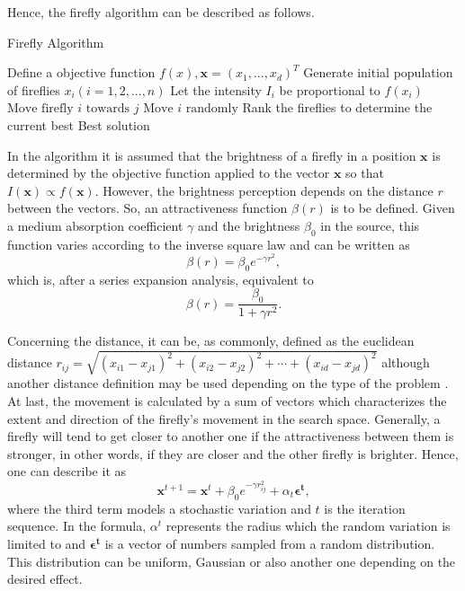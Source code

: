 \documentclass[tuberlin,cic,tc,openright,english,noabntcite,oneside]{iiufrgs}
\begin{document}
Hence, the firefly algorithm can be described as follows.
\begin{algorithm}[H]
\caption{Firefly Algorithm}
\begin{algorithmic}
\State Define a objective function $f(x), \mathbf{x}=(x_{1},...,x_{d})^{T}$
\State Generate initial population of fireflies $x_{i}(i=1,2,...,n)$
\State Let the intensity $I_{i}$ be proportional to $f(x_{i})$
				\State $\text{Move firefly }i\text{ towards }j$
			\EndIf
		\EndFor
	\EndFor
		\State $\text{Move }i\text{ randomly}$
	\EndIf
	\State Rank the fireflies to determine the current best
\EndWhile
\State \Return Best solution
\EndFunction
\end{algorithmic}
\end{algorithm}

In the algorithm it is assumed that the brightness of a firefly in a position $\mathbf{x}$ is determined by the objective function applied to the vector $\mathbf{x}$ so that $I(\mathbf{x}) \propto f(\mathbf{x})$. However, the brightness perception depends on the distance $r$ between the vectors. So, an attractiveness function $\beta(r)$ is to be defined. Given a medium absorption coefficient $\gamma$ and the brightness $\beta_{0}$ in the source, this function varies according to the inverse square law and can be written as
$$\beta(r) = \beta_{0}e^{-\gamma r^{2}},$$ which is, after a series expansion analysis, equivalent to
$$\beta(r) = \frac{\beta_{0}}{1 + \gamma r^{2}}.$$

Concerning the distance, it can be, as commonly, defined as the euclidean distance $r_{ij} = \sqrt{(x_{i1} - x_{j1})^{2}+(x_{i2} - x_{j2})^{2}+\cdots+(x_{id} - x_{jd})^{2}}$ although another distance definition may be used depending on the type of the problem \parencite[p. 193]{yang_efficiency_2012}. At last, the movement is calculated by a sum of vectors which characterizes the extent and direction of the firefly's movement in the search space. Generally, a firefly will tend to get closer to another one if the attractiveness between them is stronger, in other words, if they are closer and the other firefly is brighter. Hence, one can describe it as
$$\mathbf{x}^{t+1} = \mathbf{x}^{t} + \beta_{0}e^{-\gamma r_{ij}^{2}} + \alpha_{t} \mathbf{\epsilon^{t}},$$
where the third term models a stochastic variation and $t$ is the iteration sequence. In the formula, $\alpha^{t}$ represents the radius which the random variation is limited to and $\mathbf{\epsilon^{t}}$ is a vector of numbers sampled from a random distribution. This distribution can be uniform, Gaussian or also another one depending on the desired effect.
\end{document}
